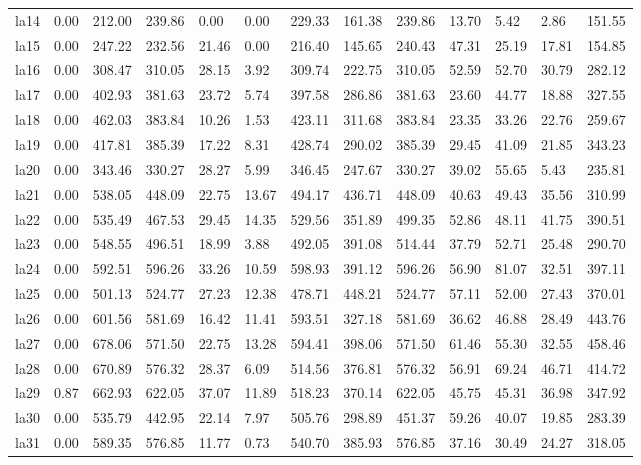 \begin{table}[htbp]
\begin{tabular}{lllllllllllll}
la14 & 0.00 & 212.00 & 239.86 & 0.00 & 0.00 & 229.33 & 161.38 & 239.86 & 13.70 & 5.42 & 2.86 & 151.55 \\
la15 & 0.00 & 247.22 & 232.56 & 21.46 & 0.00 & 216.40 & 145.65 & 240.43 & 47.31 & 25.19 & 17.81 & 154.85 \\
la16 & 0.00 & 308.47 & 310.05 & 28.15 & 3.92 & 309.74 & 222.75 & 310.05 & 52.59 & 52.70 & 30.79 & 282.12 \\
la17 & 0.00 & 402.93 & 381.63 & 23.72 & 5.74 & 397.58 & 286.86 & 381.63 & 23.60 & 44.77 & 18.88 & 327.55 \\
la18 & 0.00 & 462.03 & 383.84 & 10.26 & 1.53 & 423.11 & 311.68 & 383.84 & 23.35 & 33.26 & 22.76 & 259.67 \\
la19 & 0.00 & 417.81 & 385.39 & 17.22 & 8.31 & 428.74 & 290.02 & 385.39 & 29.45 & 41.09 & 21.85 & 343.23 \\
la20 & 0.00 & 343.46 & 330.27 & 28.27 & 5.99 & 346.45 & 247.67 & 330.27 & 39.02 & 55.65 & 5.43 & 235.81 \\
la21 & 0.00 & 538.05 & 448.09 & 22.75 & 13.67 & 494.17 & 436.71 & 448.09 & 40.63 & 49.43 & 35.56 & 310.99 \\
la22 & 0.00 & 535.49 & 467.53 & 29.45 & 14.35 & 529.56 & 351.89 & 499.35 & 52.86 & 48.11 & 41.75 & 390.51 \\
la23 & 0.00 & 548.55 & 496.51 & 18.99 & 3.88 & 492.05 & 391.08 & 514.44 & 37.79 & 52.71 & 25.48 & 290.70 \\
la24 & 0.00 & 592.51 & 596.26 & 33.26 & 10.59 & 598.93 & 391.12 & 596.26 & 56.90 & 81.07 & 32.51 & 397.11 \\
la25 & 0.00 & 501.13 & 524.77 & 27.23 & 12.38 & 478.71 & 448.21 & 524.77 & 57.11 & 52.00 & 27.43 & 370.01 \\
la26 & 0.00 & 601.56 & 581.69 & 16.42 & 11.41 & 593.51 & 327.18 & 581.69 & 36.62 & 46.88 & 28.49 & 443.76 \\
la27 & 0.00 & 678.06 & 571.50 & 22.75 & 13.28 & 594.41 & 398.06 & 571.50 & 61.46 & 55.30 & 32.55 & 458.46 \\
la28 & 0.00 & 670.89 & 576.32 & 28.37 & 6.09 & 514.56 & 376.81 & 576.32 & 56.91 & 69.24 & 46.71 & 414.72 \\
la29 & 0.87 & 662.93 & 622.05 & 37.07 & 11.89 & 518.23 & 370.14 & 622.05 & 45.75 & 45.31 & 36.98 & 347.92 \\
la30 & 0.00 & 535.79 & 442.95 & 22.14 & 7.97 & 505.76 & 298.89 & 451.37 & 59.26 & 40.07 & 19.85 & 283.39 \\
la31 & 0.00 & 589.35 & 576.85 & 11.77 & 0.73 & 540.70 & 385.93 & 576.85 & 37.16 & 30.49 & 24.27 & 318.05 \\

\end{tabular}
\end{table}
